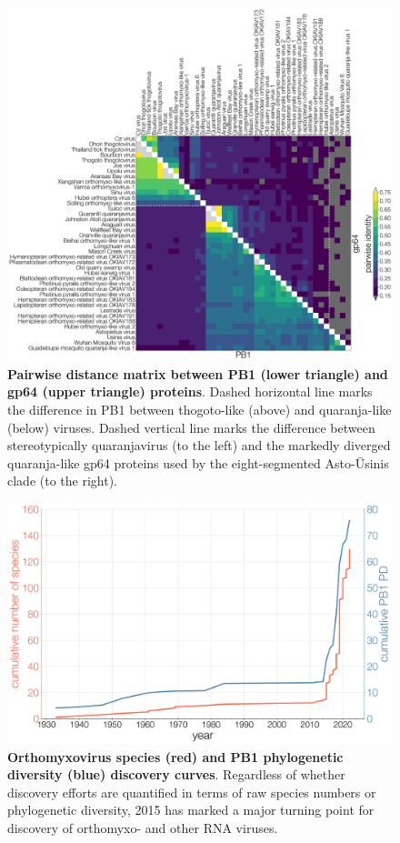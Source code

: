 \documentclass[11pt,twocolumn]{article}
\begin{document}
\begin{figure}
\centering
\includegraphics[width=\textwidth]{SuppFig6_idMatrix.png}
\caption{
\textbf{Pairwise distance matrix between PB1 (lower triangle) and gp64 (upper triangle) proteins}.
Dashed horizontal line marks the difference in PB1 between thogoto-like (above) and quaranja-like (below) viruses.
Dashed vertical line marks the difference between stereotypically quaranjavirus (to the left) and the markedly diverged quaranja-like gp64 proteins used by the eight-segmented Asto-\={U}sinis clade (to the right).
}
\end{figure}

\begin{figure}
\centering
\includegraphics[width=\textwidth]{SuppFig7_PD.png}
\caption{
\textbf{Orthomyxovirus species (red) and PB1 phylogenetic diversity (blue) discovery curves}.
Regardless of whether discovery efforts are quantified in terms of raw species numbers or phylogenetic diversity, 2015 has marked a major turning point for discovery of orthomyxo- and other RNA viruses.
}
\end{figure}

% 
\end{document}

